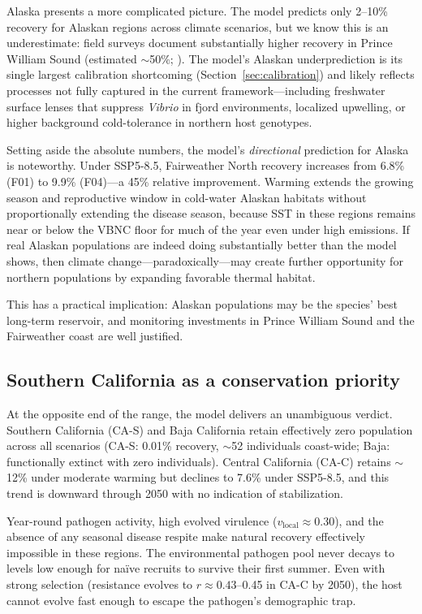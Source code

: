 Alaska presents a more complicated picture.  The model predicts only
2--10\% recovery for Alaskan regions across climate scenarios, but
we know this is an underestimate: field surveys document substantially
higher recovery in Prince William Sound (estimated ${\sim}$50\%;
\citep{gehman2025}).  The model's Alaskan underprediction is its
single largest calibration shortcoming (Section~\ref{sec:calibration})
and likely reflects processes not fully captured in the current
framework---including freshwater surface lenses that suppress
\textit{Vibrio} in fjord environments, localized upwelling, or
higher background cold-tolerance in northern host genotypes.

Setting aside the absolute numbers, the model's \textit{directional}
prediction for Alaska is noteworthy.  Under SSP5-8.5, Fairweather
North recovery increases from 6.8\% (F01) to 9.9\% (F04)---a 45\%
relative improvement.  Warming extends the growing season and
reproductive window in cold-water Alaskan habitats without
proportionally extending the disease season, because SST in these
regions remains near or below the VBNC floor for much of the year
even under high emissions.  If real Alaskan populations are indeed
doing substantially better than the model shows, then climate
change---paradoxically---may create further opportunity for northern
populations by expanding favorable thermal habitat.

This has a practical implication: Alaskan populations may be the
species' best long-term reservoir, and monitoring investments in
Prince William Sound and the Fairweather coast are well justified.

\subsection{Southern California as a conservation priority}

At the opposite end of the range, the model delivers an unambiguous
verdict.  Southern California (CA-S) and Baja California retain
effectively zero population across all scenarios (CA-S: 0.01\% recovery,
${\sim}$52 individuals coast-wide; Baja: functionally extinct with zero
individuals).  Central California (CA-C) retains ${\sim}$12\% under
moderate warming but declines to 7.6\% under SSP5-8.5, and this trend
is downward through 2050 with no indication of stabilization.

Year-round pathogen activity, high evolved virulence
($v_\mathrm{local} \approx 0.30$), and the absence of any seasonal disease
respite make natural recovery effectively impossible in these regions.
The environmental pathogen pool never decays to levels low enough for
naïve recruits to survive their first summer.  Even with strong
selection (resistance evolves to $r \approx 0.43$--0.45 in CA-C by 2050),
the host cannot evolve fast enough to escape the pathogen's demographic
trap.

